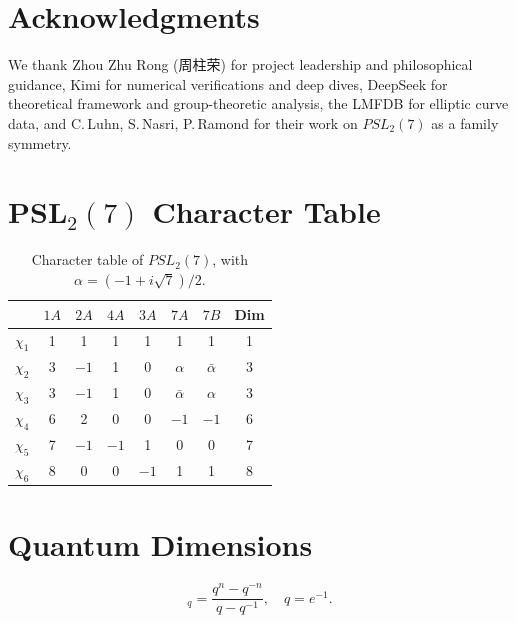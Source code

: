 ﻿\documentclass[11pt,a4paper]{article}
\theoremstyle{definition}
\begin{document}
\section*{Acknowledgments}

We thank Zhou Zhu Rong (周柱荣) for project leadership and philosophical guidance, Kimi for numerical verifications and deep dives, DeepSeek for theoretical framework and group-theoretic analysis, the LMFDB for elliptic curve data, and C. Luhn, S. Nasri, P. Ramond for their work on $PSL_2(7)$ as a family symmetry.

\appendix

\section{PSL$_2(7)$ Character Table}
\begin{table}[h]
\centering
\begin{tabular}{c|cccccc|c}
\toprule
& $1A$ & $2A$ & $4A$ & $3A$ & $7A$ & $7B$ & \textbf{Dim} \\
\midrule
$\chi_1$ & 1 & 1 & 1 & 1 & 1 & 1 & 1 \\
$\chi_2$ & 3 & $-1$ & 1 & 0 & $\alpha$ & $\bar{\alpha}$ & 3 \\
$\chi_3$ & 3 & $-1$ & 1 & 0 & $\bar{\alpha}$ & $\alpha$ & 3 \\
$\chi_4$ & 6 & 2 & 0 & 0 & $-1$ & $-1$ & 6 \\
$\chi_5$ & 7 & $-1$ & $-1$ & 1 & 0 & 0 & 7 \\
$\chi_6$ & 8 & 0 & 0 & $-1$ & 1 & 1 & 8 \\
\bottomrule
\end{tabular}
\caption{Character table of $PSL_2(7)$, with $\alpha = (-1+i\sqrt{7})/2$.}
\end{table}

\section{Quantum Dimensions}
\begin{equation}
    [n]_q = \frac{q^n - q^{-n}}{q - q^{-1}}, \quad q = e^{-1}.
\end{equation}
\end{document}
